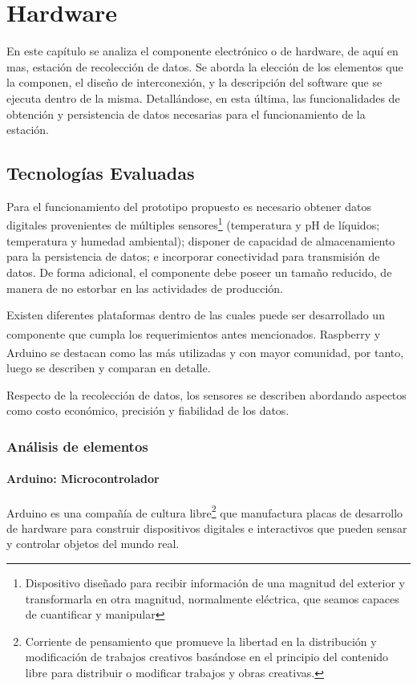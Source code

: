 \chapter{Hardware}

\par En este capítulo se analiza el componente electrónico o de hardware, de aquí en mas, estación de recolección de datos. Se aborda la elección de los elementos que la componen, el diseño de interconexión, y la descripción del software que se ejecuta dentro de la misma. Detallándose, en esta última, las funcionalidades de obtención y persistencia de datos necesarias para el funcionamiento de la estación.

\section{Tecnologías Evaluadas}
    \par Para el funcionamiento del prototipo propuesto es necesario obtener datos digitales provenientes de múltiples sensores\footnote{Dispositivo diseñado para recibir información de una magnitud del exterior y transformarla en otra magnitud, normalmente eléctrica, que seamos capaces de cuantificar y manipular} (temperatura y pH de líquidos;  temperatura y humedad ambiental); disponer de capacidad de almacenamiento para la persistencia de datos; e incorporar conectividad para transmisión de datos. De forma adicional, el componente debe poseer un tamaño reducido, de manera de no estorbar en las actividades de producción.

    \par Existen diferentes plataformas dentro de las cuales puede ser desarrollado un componente que cumpla los requerimientos antes mencionados. Raspberry\textsuperscript{\textregistered} y Arduino\textsuperscript{\textregistered} se destacan como las más utilizadas y con mayor comunidad, por tanto, luego se describen y comparan en detalle.
    
    \par Respecto de la recolección de datos, los sensores se describen abordando aspectos como costo económico, precisión y fiabilidad de los datos.
    
    \subsection{Análisis de elementos}
        \subsubsection{Arduino: Microcontrolador}
            \par Arduino\textsuperscript{\textregistered} es una compañía de cultura libre\footnote{Corriente de pensamiento que promueve la libertad en la distribución y modificación de trabajos creativos basándose en el principio del contenido libre para distribuir o modificar trabajos y obras creativas.} que manufactura placas de desarrollo de hardware para construir dispositivos digitales e interactivos que pueden sensar y controlar objetos del mundo real. 
 
